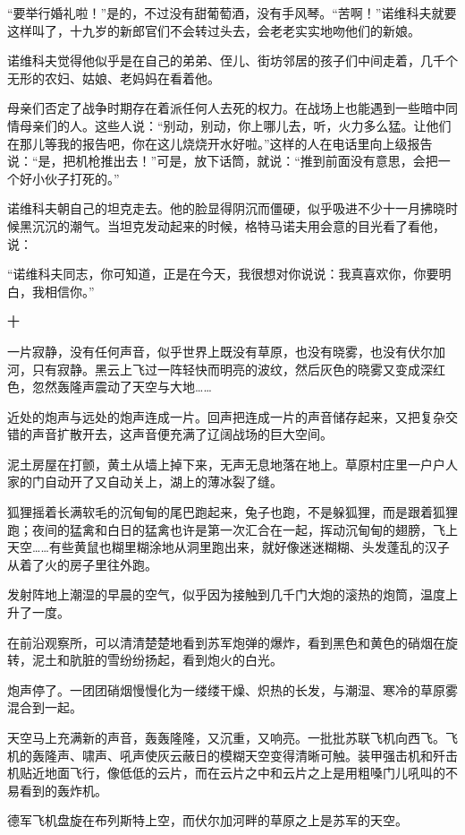 “要举行婚礼啦！”是的，不过没有甜葡萄酒，没有手风琴。“苦啊！”诺维科夫就要这样叫了，十九岁的新郎官们不会转过头去，会老老实实地吻他们的新娘。

诺维科夫觉得他似乎是在自己的弟弟、侄儿、街坊邻居的孩子们中间走着，几千个无形的农妇、姑娘、老妈妈在看着他。

母亲们否定了战争时期存在着派任何人去死的权力。在战场上也能遇到一些暗中同情母亲们的人。这些人说：“别动，别动，你上哪儿去，听，火力多么猛。让他们在那儿等我的报告吧，你在这儿烧烧开水好啦。”这样的人在电话里向上级报告说：“是，把机枪推出去！”可是，放下话筒，就说：“推到前面没有意思，会把一个好小伙子打死的。”

诺维科夫朝自己的坦克走去。他的脸显得阴沉而僵硬，似乎吸进不少十一月拂晓时候黑沉沉的潮气。当坦克发动起来的时候，格特马诺夫用会意的目光看了看他，说：

“诺维科夫同志，你可知道，正是在今天，我很想对你说说：我真喜欢你，你要明白，我相信你。”

十

一片寂静，没有任何声音，似乎世界上既没有草原，也没有晓雾，也没有伏尔加河，只有寂静。黑云上飞过一阵轻快而明亮的波纹，然后灰色的晓雾又变成深红色，忽然轰隆声震动了天空与大地……

近处的炮声与远处的炮声连成一片。回声把连成一片的声音储存起来，又把复杂交错的声音扩散开去，这声音便充满了辽阔战场的巨大空间。

泥土房屋在打颤，黄土从墙上掉下来，无声无息地落在地上。草原村庄里一户户人家的门自动开了又自动关上，湖上的薄冰裂了缝。

狐狸摇着长满软毛的沉甸甸的尾巴跑起来，兔子也跑，不是躲狐狸，而是跟着狐狸跑；夜间的猛禽和白日的猛禽也许是第一次汇合在一起，挥动沉甸甸的翅膀，飞上天空……有些黄鼠也糊里糊涂地从洞里跑出来，就好像迷迷糊糊、头发蓬乱的汉子从着了火的房子里往外跑。

发射阵地上潮湿的早晨的空气，似乎因为接触到几千门大炮的滚热的炮筒，温度上升了一度。

在前沿观察所，可以清清楚楚地看到苏军炮弹的爆炸，看到黑色和黄色的硝烟在旋转，泥土和肮脏的雪纷纷扬起，看到炮火的白光。

炮声停了。一团团硝烟慢慢化为一缕缕干燥、炽热的长发，与潮湿、寒冷的草原雾混合到一起。

天空马上充满新的声音，轰轰隆隆，又沉重，又响亮。一批批苏联飞机向西飞。飞机的轰隆声、啸声、吼声使灰云蔽日的模糊天空变得清晰可触。装甲强击机和歼击机贴近地面飞行，像低低的云片，而在云片之中和云片之上是用粗嗓门儿吼叫的不易看到的轰炸机。

德军飞机盘旋在布列斯特上空，而伏尔加河畔的草原之上是苏军的天空。

